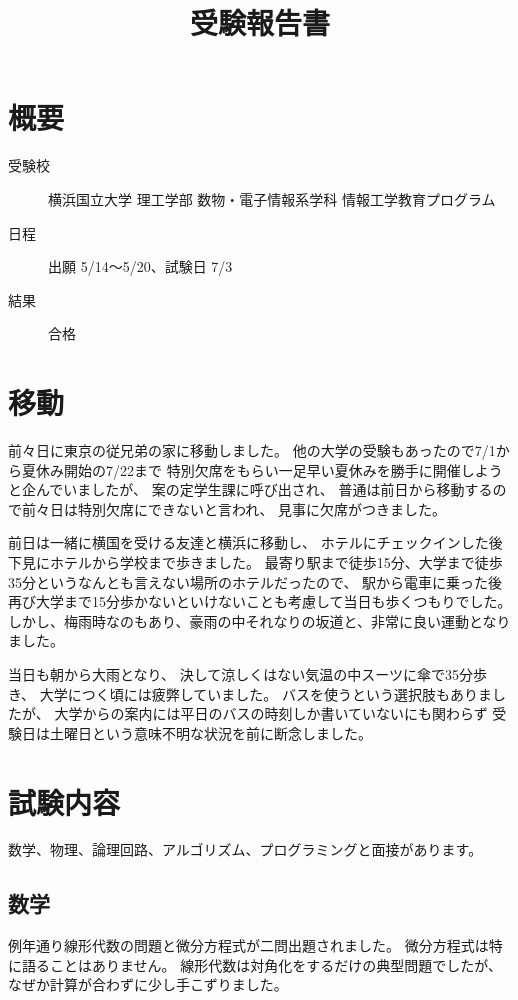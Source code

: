 \documentclass[]{jsarticle}
\title{受験報告書}
\date{}
\begin{document}
\maketitle
\section*{概要}
    \begin{description}
        \item[受験校] 横浜国立大学 理工学部 数物・電子情報系学科 情報工学教育プログラム
        \item[日程] 出願 5/14〜5/20、試験日 7/3
        \item[結果] 合格
    \end{description}
\section*{移動}
    前々日に東京の従兄弟の家に移動しました。
    他の大学の受験もあったので7/1から夏休み開始の7/22まで
    特別欠席をもらい一足早い夏休みを勝手に開催しようと企んでいましたが、
    案の定学生課に呼び出され、
    普通は前日から移動するので前々日は特別欠席にできないと言われ、
    見事に欠席がつきました。

    前日は一緒に横国を受ける友達と横浜に移動し、
    ホテルにチェックインした後下見にホテルから学校まで歩きました。
    最寄り駅まで徒歩15分、大学まで徒歩35分というなんとも言えない場所のホテルだったので、
    駅から電車に乗った後再び大学まで15分歩かないといけないことも考慮して当日も歩くつもりでした。
    しかし、梅雨時なのもあり、豪雨の中それなりの坂道と、非常に良い運動となりました。

    当日も朝から大雨となり、
    決して涼しくはない気温の中スーツに傘で35分歩き、
    大学につく頃には疲弊していました。
    バスを使うという選択肢もありましたが、
    大学からの案内には平日のバスの時刻しか書いていないにも関わらず
    受験日は土曜日という意味不明な状況を前に断念しました。
\section*{試験内容}
    数学、物理、論理回路、アルゴリズム、プログラミングと面接があります。
    \subsection*{数学}
        例年通り線形代数の問題と微分方程式が二問出題されました。
        微分方程式は特に語ることはありません。
        線形代数は対角化をするだけの典型問題でしたが、
        なぜか計算が合わずに少し手こずりました。
\end{document}
